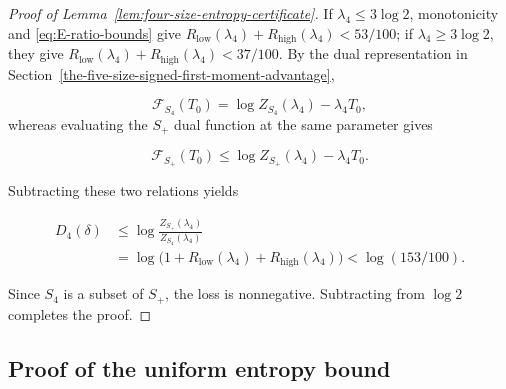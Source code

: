\documentclass[a4paper,10pt,reqno]{amsart}
\numberwithin{equation}{section}
\theoremstyle{plain}
\theoremstyle{remark}
\begin{document}
\begin{proof}[Proof of Lemma~\ref{lem:four-size-entropy-certificate}]
If \(\lambda_4\le 3{\log 2}\), monotonicity and \eqref{eq:E-ratio-bounds} give
\(R_{\mathrm{low}}(\lambda_4)+R_{\mathrm{high}}(\lambda_4)<53/100\); if
\(\lambda_4\ge 3{\log 2}\), they give
\(R_{\mathrm{low}}(\lambda_4)+R_{\mathrm{high}}(\lambda_4)<37/100\).
By the dual representation in
Section~\ref{the-five-size-signed-first-moment-advantage},

\[
 \mathcal F_{S_4}(T_0)
 =\log Z_{S_4}(\lambda_4)-\lambda_4T_0,
\]
whereas evaluating the \(S_+\) dual function at the same parameter gives

\[
 \mathcal F_{S_+}(T_0)
 \le \log Z_{S_+}(\lambda_4)-\lambda_4T_0.
\]

Subtracting these two relations yields

\[
 \begin{aligned}
 D_4(\delta)
 &\le \log\frac{Z_{S_+}(\lambda_4)}{Z_{S_4}(\lambda_4)}\\
 &=\log\!\bigl(1+R_{\mathrm{low}}(\lambda_4)
                    +R_{\mathrm{high}}(\lambda_4)\bigr)
 <\log(153/100).
 \end{aligned}
\]

Since \(S_4\) is a subset of \(S_+\), the loss is
nonnegative. Subtracting from \(\log 2\) completes the proof.
\end{proof}

\subsection{Proof of the uniform entropy bound}
\label{app:entropy-gap-proof}
\end{document}
